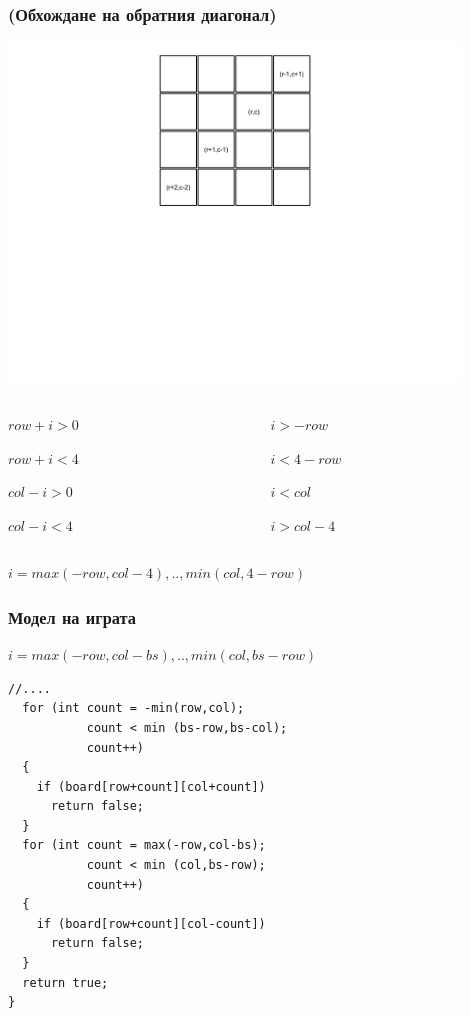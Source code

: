 \documentclass{beamer}
\begin{document}
\begin{frame}[fragile]
\frametitle{(Обхождане на обратния диагонал)}
\begin{center}
\includegraphics[width=12cm]{images/cb_count}
\end{center}
\vspace*{-150pt}

\begin{columns}[t]
  \begin{column}{0.3\textwidth}
$row+i > 0$

$row + i < 4$

$col-i > 0$

$col - i < 4$ 
  \end{column}
  \begin{column}{0.5\textwidth}
$i > -row$

$i < 4-row$

$i < col$

$i > col - 4$ 

  \end{column}

\end{columns}

\begin{center}
$i=max(-row,col-4),..,min (col,4-row)$
\end{center}

\end{frame}

\begin{frame}[fragile]
\frametitle{Модел на играта}

\begin{center}
$i=max(-row,col-bs),..,min (col,bs-row)$
\end{center}

\begin{lstlisting}
//....
  for (int count = -min(row,col); 
           count < min (bs-row,bs-col);
           count++)
  {
    if (board[row+count][col+count])
      return false;
  }
  for (int count = max(-row,col-bs); 
           count < min (col,bs-row);
           count++)
  {
    if (board[row+count][col-count])
      return false;
  }
  return true;
}
\end{lstlisting}


\end{frame}
\end{document}
